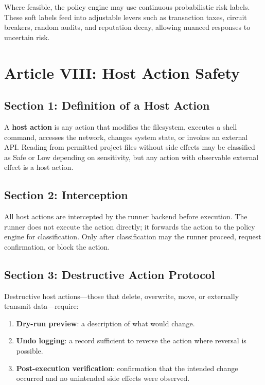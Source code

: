 \documentclass[12pt,letterpaper]{article}
\begin{document}
Where feasible, the policy engine may use continuous probabilistic risk labels. These soft labels feed into adjustable levers such as transaction taxes, circuit breakers, random audits, and reputation decay, allowing nuanced responses to uncertain risk.

\section{Article VIII: Host Action Safety}
\label{art:host-safety}

\subsection{Section 1: Definition of a Host Action}

A \textbf{host action} is any action that modifies the filesystem, executes a shell command, accesses the network, changes system state, or invokes an external API. Reading from permitted project files without side effects may be classified as Safe or Low depending on sensitivity, but any action with observable external effect is a host action.

\subsection{Section 2: Interception}

All host actions are intercepted by the runner backend before execution. The runner does not execute the action directly; it forwards the action to the policy engine for classification. Only after classification may the runner proceed, request confirmation, or block the action.

\subsection{Section 3: Destructive Action Protocol}

Destructive host actions---those that delete, overwrite, move, or externally transmit data---require:

\begin{enumerate}
    \item \textbf{Dry-run preview}: a description of what would change.
    \item \textbf{Undo logging}: a record sufficient to reverse the action where reversal is possible.
    \item \textbf{Post-execution verification}: confirmation that the intended change occurred and no unintended side effects were observed.
\end{enumerate}
\end{document}
